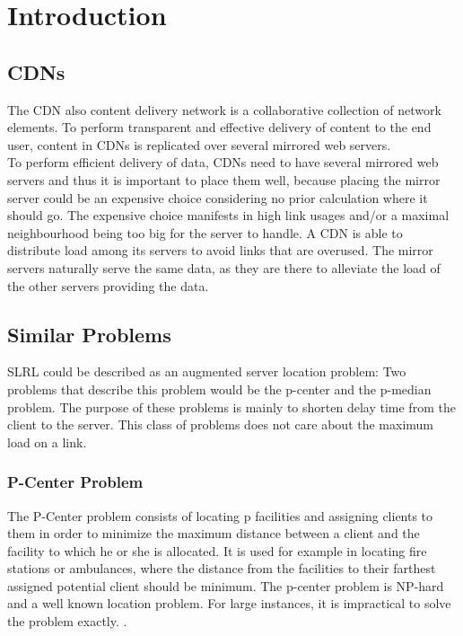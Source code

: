 \documentclass [12pt]{article}
\begin{document}
\thispagestyle{empty}

\newpage
\tableofcontents
\newpage


\section{Introduction}
\subsection {CDNs}
The CDN also content delivery network is a collaborative collection of network elements.
To perform transparent and effective delivery of content to the end user, content in CDNs is replicated over 
several mirrored web servers. \cite[p. 3]{Buyya:2008:CDN:1457653}\\
To perform efficient delivery of data, CDNs need to have several mirrored web servers
and thus it is important to place them well, because placing the mirror server 
could be an expensive choice considering no prior calculation where it should go. 
The expensive choice manifests in high link usages and/or a maximal neighbourhood being
too big for the server to handle. A CDN is able to distribute load among its servers to avoid
links that are overused.
The mirror servers naturally serve the same data, as they are there to alleviate the 
load of the other servers providing the data.

\subsection {Similar Problems}
SLRL could be described as an augmented server location problem: 
Two problems that describe this problem would be the p-center and the
p-median problem. The purpose of these problems is mainly to shorten delay
time from the client to the server. 
This class of problems does not care about the maximum load on a link.

\subsubsection {P-Center Problem}
The P-Center problem consists of locating p facilities and assigning clients
to them in order to minimize the maximum distance between a client and the facility
to which he or she is allocated. It is used for example in locating fire stations or ambulances,
where the distance from the facilities 
to their farthest assigned potential client should be minimum.
The p-center problem is NP-hard and a well known location problem.
For large instances, it is impractical to solve the problem exactly.
\cite{KarivHakimi1979}.
\end{document}
